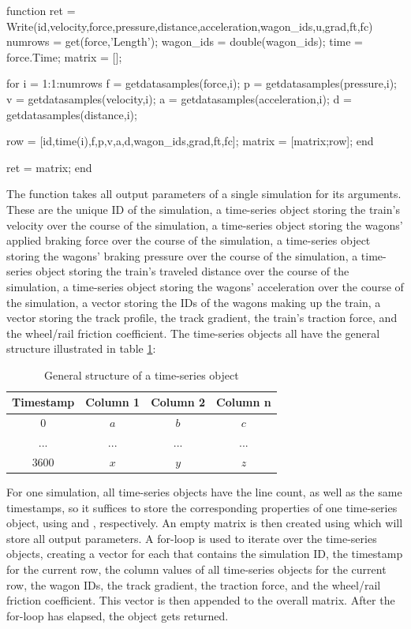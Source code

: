 \bigskip
\begin{python}
function ret = Write(id,velocity,force,pressure,distance,acceleration,wagon_ids,u,grad,ft,fc)
	numrows = get(force,'Length');
	wagon_ids = double(wagon_ids);
	time = force.Time;
	matrix = [];
	
	for i = 1:1:numrows
		f = getdatasamples(force,i);
		p = getdatasamples(pressure,i);
		v = getdatasamples(velocity,i);
		a = getdatasamples(acceleration,i);
		d = getdatasamples(distance,i);
		
		row = [id,time(i),f,p,v,a,d,wagon_ids,grad,ft,fc];
		matrix = [matrix;row];
	end
	
	ret = matrix;
end
\end{python}
\bigskip

\noindent
The  function takes all output parameters of a single simulation for its arguments. These are the unique ID of the simulation, a time-series object storing the train's velocity over the course of the simulation, a time-series object storing the wagons' applied braking force over the course of the simulation, a time-series object storing the wagons' braking pressure over the course of the simulation, a time-series object storing the train's traveled distance over the course of the simulation, a time-series object storing the wagons' acceleration over the course of the simulation, a vector storing the IDs of the wagons making up the train, a vector storing the track profile, the track gradient, the train's traction force, and the wheel/rail friction coefficient. The time-series objects all have the general structure illustrated in table \ref{tab:timeseries}:

\bigskip
\begin{table}[htb!]
	\centering
	\begin{tabular}{c|c|c|c}
		Timestamp & Column 1 & Column 2 & Column n \\
		\hline
		0 & $a$ & $b$ & $c$ \\
		\hline
		... & ... & ... & ... \\
		\hline
		3600 & $x$ & $y$ & $z$ \\
	\end{tabular}
	\caption{General structure of a time-series object}
	\label{tab:timeseries}
\end{table}

\bigskip

\noindent
For one simulation, all time-series objects have the line count, as well as the same timestamps, so it suffices to store the corresponding properties of one time-series object, using  and , respectively. An empty matrix is then created using  which will store all output parameters. A for-loop is used to iterate over the time-series objects, creating a vector for each  that contains the simulation ID, the timestamp for the current row, the column values of all time-series objects for the current row, the wagon IDs, the track gradient, the traction force, and the wheel/rail friction coefficient. This vector is then appended to the overall matrix. After the for-loop has elapsed, the  object gets returned.

